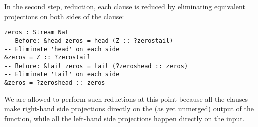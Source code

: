 

In the second step, reduction, each clause is reduced by eliminating equivalent
projections on both sides of the clause:
\begin{lstlisting}[mathescape]
zeros : Stream Nat
-- Before: &head zeros = head (Z :: ?zerostail)
-- Eliminate 'head' on each side
&zeros = Z :: ?zerostail
-- Before: &tail zeros = tail (?zeroshead :: zeros)
-- Eliminate 'tail' on each side
&zeros = ?zeroshead :: zeros
\end{lstlisting}
We are allowed to perform such reductions at this point because all the clauses
make right-hand side projections directly on the (as yet unmerged) output of the
function, while all the left-hand side projections happen directly on the input.

